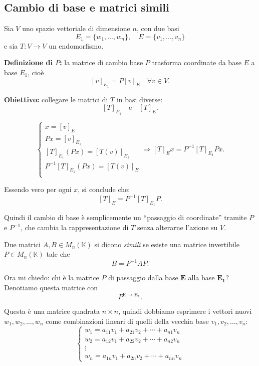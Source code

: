 \documentclass[12pt,a4paper]{article}
\begin{document}
\subsection*{Cambio di base e matrici simili}
Sia \( V \) uno spazio vettoriale di dimensione \( n \), con due basi
\[
E_1 = \{ w_1, \ldots, w_n \}, \quad E = \{ v_1, \ldots, v_n \}
\]
e sia \( T: V \to V \) un endomorfismo.

\vspace{0.3cm}
\textbf{Definizione di \( P \):} la matrice di cambio base \( P \) trasforma coordinate da base \( E \) a base \( E_1 \), cioè
\[
[v]_{E_1} = P [v]_{E} \quad \forall v \in V.
\]

\vspace{0.3cm}
\textbf{Obiettivo:} collegare le matrici di \( T \) in basi diverse:
\[
[T]_{E_1} \quad \text{e} \quad [T]_{E}.
\]

\vspace{0.3cm}
\[
\begin{cases}
x = [v]_{E} \\[6pt]
P x = [v]_{E_1} \\[6pt]
[T]_{E_1} (P x) = [T(v)]_{E_1} \\[6pt]
P^{-1} [T]_{E_1} (P x) = [T(v)]_{E} \\[6pt]
\end{cases}
\Rightarrow
[T]_{E} x = P^{-1} [T]_{E_1} P x.
\]

Essendo vero per ogni \( x \), si conclude che:
\[
\boxed{
[T]_{E} = P^{-1} [T]_{E_1} P.
}
\]

Quindi il cambio di base è semplicemente un “passaggio di coordinate” tramite \( P \) e \( P^{-1} \), che cambia la rappresentazione di \( T \) senza alterarne l’azione su \( V \).

Due matrici \( A, B \in M_n(\mathbb{K}) \) si dicono \emph{simili} se esiste una matrice invertibile \( P \in M_n(\mathbb{K}) \) tale che
\[
B = P^{-1} A P.
\]

\vspace{1em}
\hline
\vspace{1em}

Ora mi chiedo: chi è la matrice \( P \) di passaggio dalla base \(\bm{E}\) alla base \(\bm{E_1}\)?
Denotiamo questa matrice con
\[
P^{\bm{E} \to \bm{E_1}}.
\]

Questa è una matrice quadrata \( n \times n \), quindi dobbiamo esprimere i vettori nuovi \( w_1, w_2, \ldots, w_n \) come combinazioni lineari di quelli della vecchia base \( v_1, v_2, \ldots, v_n \):
\[
\begin{cases}
w_1 = a_{11} v_1 + a_{21} v_2 + \cdots + a_{n1} v_n \\
w_2 = a_{12} v_1 + a_{22} v_2 + \cdots + a_{n2} v_n \\
\vdots \\
w_n = a_{1n} v_1 + a_{2n} v_2 + \cdots + a_{nn} v_n
\end{cases}
\]
\end{document}
